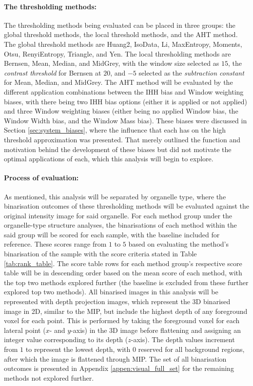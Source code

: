 \paragraph{The thresholding methods:} The thresholding methods being evaluated can be placed in three groups: the global threshold methods, the local threshold methods, and the AHT method. The global threshold methods are Huang2, IsoData, Li, MaxEntropy, Moments, Otsu, RenyiEntropy, Triangle, and Yen. The local thresholding methods are Bernsen, Mean, Median, and MidGrey, with the window size selected as $15$, the \textit{contrast threshold} for Bernsen at $20$, and $-5$ selected as the \textit{subtraction constant} for Mean, Median, and MidGrey. The AHT method will be evaluated by the different application combinations between the IHH bias and Window weighting biases, with there being two IHH bias options (either it is applied or not applied) and three Window weighting biases (either being no applied Window bias, the Window Width bias, and the Window Mass bias). These biases were discussed in Section \ref{sec:system_biases}, where the influence that each has on the high threshold approximation was presented. That merely outlined the function and motivation behind the development of these biases but did not motivate the optimal applications of each, which this analysis will begin to explore.
\paragraph{Process of evaluation:} As mentioned, this analysis will be separated by organelle type, where the binarisation outcomes of these thresholding methods will be evaluated against the original intensity image for said organelle. For each method group under the organelle-type structure analyses, the binarisations of each method within the said group will be scored for each sample, with the baseline included for reference. These scores range from $1$ to $5$ based on evaluating the method's binarisation of the sample with the score criteria stated in Table \ref{tab:rank_table}. The score table rows for each method group's respective score table will be in descending order based on the mean score of each method, with the top two methods explored further (the baseline is excluded from these further explored top two methods). All binarised images in this analysis will be represented with depth projection images, which represent the 3D binarised image in 2D, similar to the MIP, but include the highest depth of any foreground voxel for each point. This is performed by taking the foreground voxel for each lateral point ($x$- and $y$-axis) in the 3D image before flattening and assigning an integer value corresponding to its depth ($z$-axis). The depth values increment from $1$ to represent the lowest depth, with $0$ reserved for all background regions, after which the image is flattened through MIP. The set of all binarisation outcomes is presented in Appendix \ref{appen:visual_full_set} for the remaining methods not explored further.

